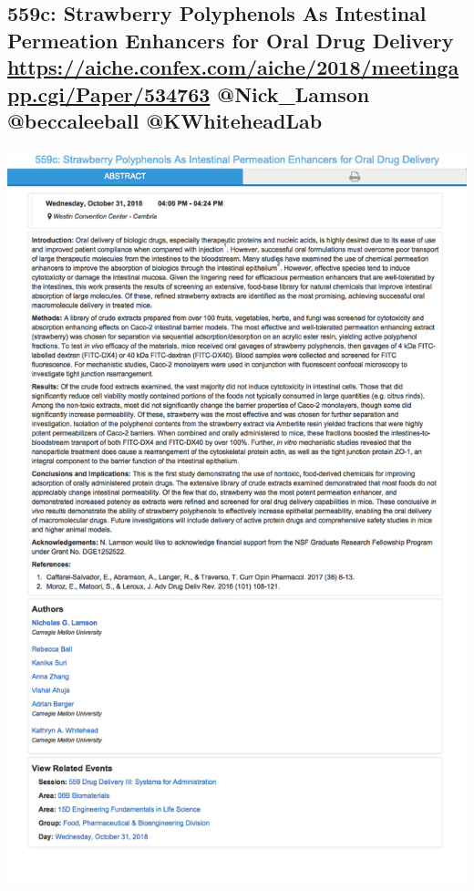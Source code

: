 \documentclass[11pt]{article}
\begin{document}
\subsection{559c: Strawberry Polyphenols As Intestinal Permeation Enhancers for Oral Drug Delivery \url{https://aiche.confex.com/aiche/2018/meetingapp.cgi/Paper/534763}  @Nick\_Lamson @beccaleeball @KWhiteheadLab}
\label{sec:org5fceb53}
\begin{center}
\includegraphics[width=.9\linewidth]{./534763.png}
\end{center}
\end{document}
